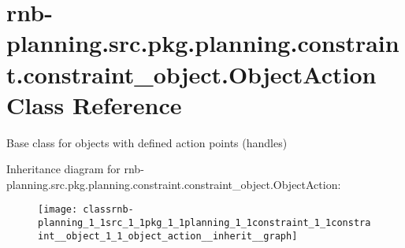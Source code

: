 \hypertarget{classrnb-planning_1_1src_1_1pkg_1_1planning_1_1constraint_1_1constraint__object_1_1_object_action}{}\section{rnb-\/planning.src.\+pkg.\+planning.\+constraint.\+constraint\+\_\+object.\+Object\+Action Class Reference}
\label{classrnb-planning_1_1src_1_1pkg_1_1planning_1_1constraint_1_1constraint__object_1_1_object_action}


Base class for objects with defined action points (handles)  




Inheritance diagram for rnb-\/planning.src.\+pkg.\+planning.\+constraint.\+constraint\+\_\+object.\+Object\+Action\+:\nopagebreak
\begin{figure}[H]
\begin{center}
\leavevmode
\texttt{[image: classrnb-planning\_1\_1src\_1\_1pkg\_1\_1planning\_1\_1constraint\_1\_1constraint\_\_object\_1\_1\_object\_action\_\_inherit\_\_graph]}
\end{center}
\end{figure}
